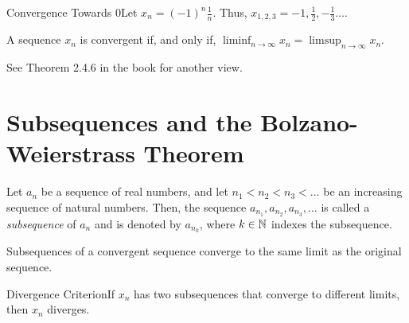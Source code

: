 \begin{example}
    {Convergence Towards 0}Let \(x_n = (-1)^n\frac{1}{n}\). Thus, \(x_{1,2,3} = -1, \frac{1}{2}, -\frac{1}{3}\dots\).
\end{example}

\begin{theorem}
    A sequence \(x_n\) is convergent if, and only if, \(\liminf_{n \to \infty} x_n = \limsup_{n \to \infty} x_n\).  
\end{theorem} See Theorem 2.4.6 in the book for another view.

\section{Subsequences and the Bolzano-Weierstrass Theorem}

\begin{definition}
    Let \(a_n\) be a sequence of real numbers, and let \(n_1 < n_2 < n_3 < \dots\) be an increasing sequence of natural numbers. Then, the sequence \(a_{n_1}, a_{n_2}, a_{n_3}, \dots\) is called a \textit{subsequence} of \(a_n\) and is denoted by \(a_{n_k}\), where \(k \in \mathbb{N}\) indexes the subsequence.
\end{definition}

\begin{theorem}
    Subsequences of a convergent sequence converge to the same limit as the original sequence.
\end{theorem}


\begin{ntheorem}
    {Divergence Criterion}If \(x_n\) has two subsequences that converge to different limits, then \(x_n\) diverges.
\end{ntheorem}

